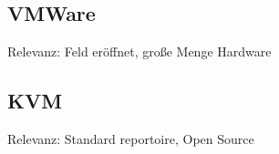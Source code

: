 

		\subsection{VMWare}

		Relevanz: Feld eröffnet, große Menge Hardware

		\subsection{KVM}

		Relevanz: Standard reportoire, Open Source

		